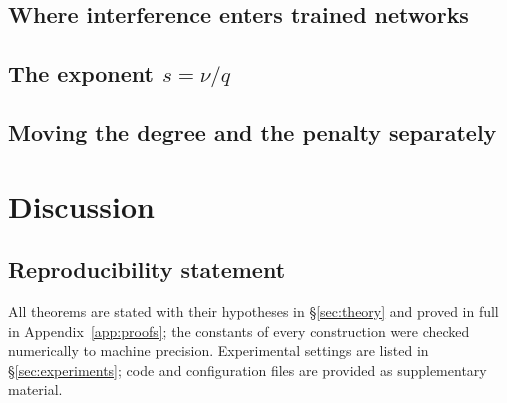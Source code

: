 \documentclass{article} %
\theoremstyle{plain}
\theoremstyle{definition}
\theoremstyle{remark}
\begin{document}
\subsection{Where interference enters trained networks}
\subsection{The exponent $s=\nu/q$}
\subsection{Moving the degree and the penalty separately}

\section{Discussion}
\label{sec:discussion}

\subsection*{Reproducibility statement}
All theorems are stated with their hypotheses in \S\ref{sec:theory} and proved in full in Appendix~\ref{app:proofs}; the constants of every construction were checked numerically to machine precision. Experimental settings are listed in \S\ref{sec:experiments}; code and configuration files are provided as supplementary material.




\appendix

\end{document}

